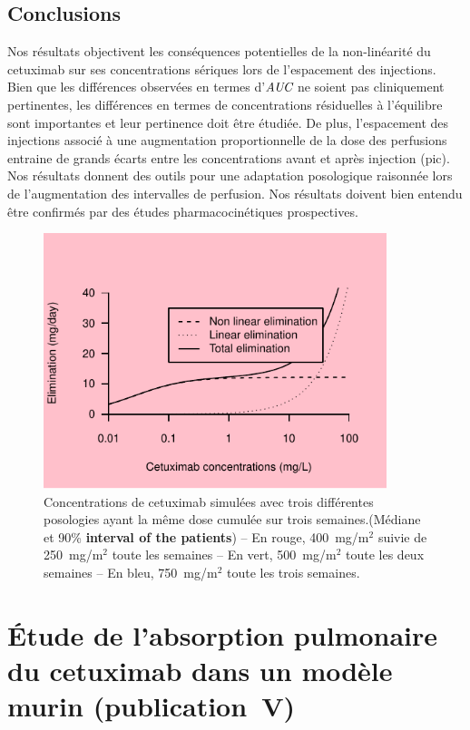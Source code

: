 \subsection{Conclusions}
Nos résultats objectivent les conséquences potentielles de la non-linéarité du cetuximab sur ses concentrations sériques lors de l'espacement des injections. Bien que les différences observées en termes d'$\operatorname{\textit{AUC}}$ ne soient pas cliniquement pertinentes, les différences en termes de concentrations résiduelles à l'équilibre sont importantes et leur pertinence doit être étudiée. De plus, l'espacement des injections associé à une augmentation proportionnelle de la dose des perfusions entraine de grands écarts entre les concentrations avant et après injection (pic). Nos résultats donnent des outils pour une adaptation posologique raisonnée lors de l'augmentation des intervalles de perfusion. Nos résultats doivent bien entendu être confirmés par des études pharmacocinétiques prospectives.
\begin{figure}[htbp]
	\centering
		\includegraphics[width=10cm]{images/essai001.pdf}
	\caption{Concentrations de cetuximab simulées avec trois différentes posologies ayant la même dose cumulée sur trois semaines.(Médiane et 90\% \textbf{interval of the patients}) – En rouge, 400~mg/m$^2$ suivie de 250~mg/m$^2$ toute les semaines – En vert, 500~mg/m$^2$ toute les deux semaines – En bleu, 750~mg/m$^2$ toute les trois semaines.}
	\label{fig:32}
\end{figure}
\section{Étude de l'absorption pulmonaire du cetuximab dans un modèle murin (publication~V)}
